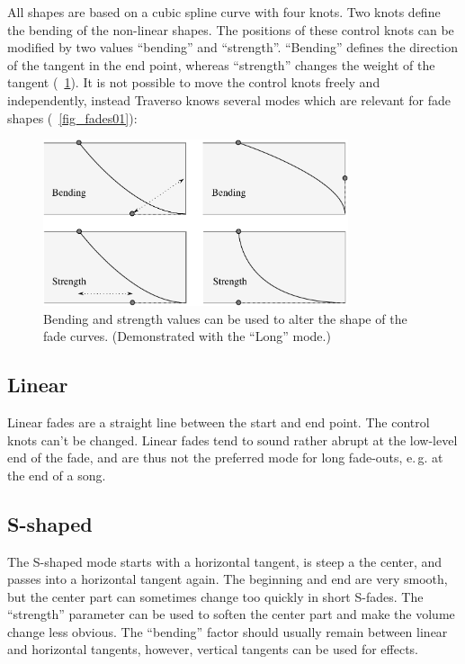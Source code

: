 All shapes are based on a cubic spline curve with four knots. Two knots define the bending of the non-linear shapes. The positions of these control knots can be modified by two values ``bending'' and ``strength''. ``Bending'' defines the direction of the tangent in the end point, whereas ``strength'' changes the weight of the tangent (\FigB~\ref{fig_fades02}). It is not possible to move the control knots freely and independently, instead Traverso knows several modes which are relevant for fade shapes (\FigB~\ref{fig_fades01}):

\begin{figure}[t]
 \centering\includegraphics[width=0.8\textwidth]{images/fades2}
 \caption{Bending and strength values can be used to alter the shape of the fade curves. (Demonstrated with the ``Long'' mode.)}
 \label{fig_fades02}
\end{figure}

\subsection{Linear}
Linear fades are a straight line between the start and end point. The control knots can't be changed. Linear fades tend to sound rather abrupt at the low-level end of the fade, and are thus not the preferred mode for long fade-outs, e.\,g. at the end of a song.

\subsection{S-shaped}
The S-shaped mode starts with a horizontal tangent, is steep a the center, and passes into a horizontal tangent again. The beginning and end are very smooth, but the center part can sometimes change too quickly in short S-fades. The ``strength'' parameter can be used to soften the center part and make the volume change less obvious. The ``bending'' factor should usually remain between linear and horizontal tangents, however, vertical tangents can be used for effects.

